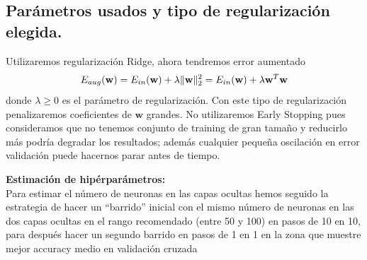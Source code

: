 \documentclass[11pt,a4paper]{article}
\DeclarePairedDelimiter{\norm}{\lVert}{\rVert}
\theoremstyle{definition}
\begin{document}
	\subsection{Parámetros usados y tipo de regularización elegida.}
	Utilizaremos regularización Ridge, ahora tendremos error aumentado 
	$$E_{aug}(\mathbf{w})=E_{in}(\mathbf{w})+\lambda \norm{\mathbf{w}}_2^2 = E_{in}(\mathbf{w})+\lambda \mathbf{w}^T\mathbf{w}$$
	donde $\lambda \geq 0$ es el parámetro de regularización. Con este tipo de regularización penalizaremos coeficientes de $\mathbf{w}$ grandes.
	No utilizaremos Early Stopping pues consideramos que no tenemos conjunto de training de gran tamaño y reducirlo más podría degradar los resultados; además cualquier pequeña oscilación en error validación puede hacernos parar antes de tiempo.
	
	\textbf{Estimación de hipérparámetros:}\\
	Para estimar el número de neuronas en las capas ocultas hemos seguido la estrategia de hacer un ``barrido'' inicial  con el mismo número de neuronas en las dos capas ocultas en el rango recomendado (entre 50 y 100) en pasos de 10 en 10, para después hacer un segundo barrido en pasos de 1 en 1 en la zona que muestre mejor accuracy medio en validación cruzada 
\end{document}
